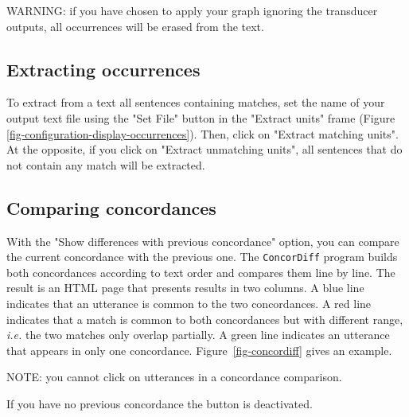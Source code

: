 \bigskip
\noindent WARNING: if you have chosen to apply your graph ignoring the
transducer outputs, all occurrences will be erased from the text.




\subsection{Extracting occurrences}
To extract from a text all sentences containing matches, set the name of your
output text file using the "Set File" button in the "Extract units" frame (Figure
\ref{fig-configuration-display-occurrences}). Then, click on "Extract matching
units". At the opposite, if you click on "Extract unmatching units", all
sentences that do not contain any match will be extracted.


\subsection{Comparing concordances}
\label{section-comparing-concordances}
With the "Show differences with previous concordance" option, you can compare the
current concordance with the previous one. The \verb+ConcorDiff+ program builds
both concordances according to text order and compares them line by line. The
result is an HTML page that presents results in two columns. A blue line
indicates that an utterance is common to the two concordances. A red line
indicates that a match is common to both concordances but with different range,
\textit{i.e.} the two matches only overlap partially. A green line indicates an
utterance that appears in only one concordance. Figure~\ref{fig-concordiff} gives an
example.

\bigskip
\noindent NOTE: you cannot click on utterances in a concordance comparison.

\bigskip
\noindent If you have no previous concordance the button is deactivated.

